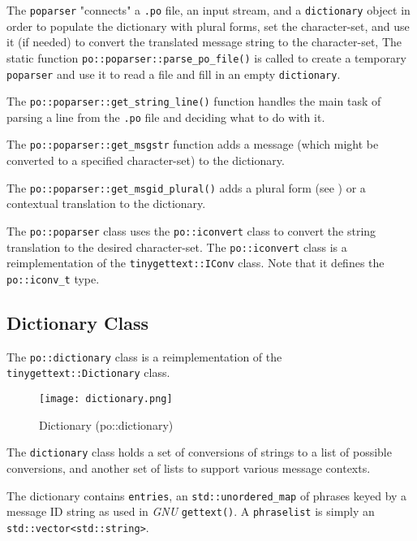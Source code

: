    The \texttt{poparser} "connects" a \texttt{.po} file, an input stream,
   and a \texttt{dictionary} object in order to populate the dictionary with
   plural forms, set the character-set, and use it (if needed) to convert the
   translated message string to the character-set,
   The static function \texttt{po::poparser::parse\_po\_file()} is called to
   create a temporary \texttt{poparser} and use it to
   read a file and fill in an empty \texttt{dictionary}.

   The \texttt{po::poparser::get\_string\_line()} function handles the
   main task of parsing a line from the \texttt{.po} file and deciding
   what to do with it.

   The \texttt{po::poparser::get\_msgstr} function adds a message (which might
   be converted to a specified character-set) to the dictionary.

   The \texttt{po::poparser::get\_msgid\_plural()} adds a plural form
   (see )
   or a contextual translation to the dictionary.


   The \texttt{po::poparser} class uses the \texttt{po::iconvert} class
   to convert the string translation to the desired character-set.
   The \texttt{po::iconvert} class is a reimplementation of the
   \texttt{tinygettext::IConv} class.
   Note that it defines the \texttt{po::iconv\_t} type.

\subsection{Dictionary Class}
\label{subsec:potext_dictionary_class}

   The \texttt{po::dictionary} class is a reimplementation of the
   \texttt{tinygettext::Dictionary} class.

\begin{figure}[H]
   \centering 
   \texttt{[image: dictionary.png]}
   \caption{Dictionary (po::dictionary)}
   \label{fig:potext_dictionary}
\end{figure}

   The \texttt{dictionary} class holds a set of conversions of strings to a
   list of possible conversions, and another set of lists to support various
   message contexts.

   The dictionary contains \texttt{entries}, an \texttt{std::unordered\_map}
   of phrases keyed by a message ID string as used in \textsl{GNU}
   \texttt{gettext()}.
   A \texttt{phraselist} is simply an \texttt{std::vector<std::string>}.

